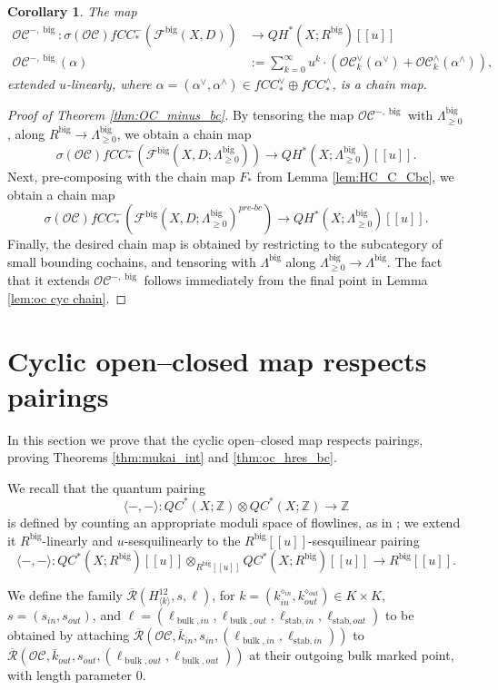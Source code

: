 \documentclass{article}
\newtheorem{cor}[lem]{Corollary}
\def\fuk{\EuF}
\def\cO{\mathcal{O}}
\def\cC{\mathcal{C}}
\def\Z{\mathbb{Z}}
\def\fuk{\mathcal{F}}
\def\prebc{{pre\text{-}bc}}
\def\Rbar{\overline{\mathcal{R}}}
\def\stab{\mathrm{stab}}
\def\big{{\operatorname{big}}}
\def\bulk{{\operatorname{bulk}}}
\begin{document}
\begin{cor}
    The map 
    \begin{align*}
        \cO\cC^{-,\big}: \sigma(\cO\cC)fCC_*^-(\fuk^\big(X,D)) & \to QH^*(X;R^\big)[[u]] \\
        \cO\cC^{-,\big}(\alpha) & := \sum_{k=0}^\infty u^k\cdot \left(\cO\cC^\vee_k(\alpha^\vee) + \cO\cC^\wedge_k(\alpha^\wedge)\right),
    \end{align*}
    extended $u$-linearly, where $\alpha = (\alpha^\vee,\alpha^\wedge) \in fCC^{\vee}_* \oplus fCC^{\wedge}_*$, is a chain map.
\end{cor}

\begin{proof}[Proof of Theorem \ref{thm:OC_minus_bc}]
    By tensoring the map $\cO\cC^{-,\big}$ with $\Lambda^\big_{\ge 0}$, along $R^\big \to \Lambda^\big_{\ge 0}$, we obtain a chain map
    $$\sigma(\cO\cC)fCC_*^-(\fuk^\big(X,D;\Lambda^\big_{\ge 0})) \to QH^*(X;\Lambda^\big_{\ge 0})[[u]].$$
    Next, pre-composing with the chain map $F_*$ from Lemma \ref{lem:HC_C_Cbc}, we obtain a chain map
    $$\sigma(\cO\cC)fCC_*^-(\fuk^\big(X,D;\Lambda^\big_{\ge 0})^{\prebc}) \to QH^*(X;\Lambda^\big_{\ge 0})[[u]].$$ 
    Finally, the desired chain map is obtained by restricting to the subcategory of small bounding cochains, and tensoring with $\Lambda^\big$ along $\Lambda^\big_{\ge 0} \to \Lambda^\big$. 
    The fact that it extends $\cO\cC^{-,\big}$ follows immediately from the final point in Lemma \ref{lem:oc cyc chain}.
\end{proof}

\section{Cyclic open--closed map respects pairings}\label{sec:oc pair}

In this section we prove that the cyclic open--closed map respects pairings, proving Theorems \ref{thm:mukai_int} and \ref{thm:oc_hres_bc}.

We recall that the quantum pairing
$$\langle-,-\rangle: QC^*(X;\Z) \otimes QC^*(X;\Z) \to \Z$$
is defined by counting an appropriate moduli space of flowlines, as in \cite[Section 4.1]{relfukii}; we extend it $R^\big$-linearly and $u$-sesquilinearly to the $R^\big[[u]]$-sesquilinear pairing
$$\langle -, - \rangle : QC^*(X;R^\big)[[u]] \otimes_{R^\big[[u]]} QC^*(X;R^\big)[[u]] \to R^\big[[u]]. $$

We define the family $\Rbar(H^{12}_{\langle k \rangle},s,\ell)$, for $k=(k^{\diamond_{in}}_{in},k^{\diamond_{out}}_{out}) \in K \times K$, $s=(s_{in},s_{out})$, and $\ell = (\ell_{\bulk,in},\ell_{\bulk,out},\ell_{\stab,in},\ell_{\stab,out})$ to be obtained by attaching $\Rbar(\cO\cC,\bar{k}_{in},s_{in},(\ell_{\bulk,in},\ell_{\stab,in}))$ to $\Rbar(\cO\cC,\bar{k}_{out},s_{out},(\ell_{\bulk,out},\ell_{\bulk,out}))$ at their outgoing bulk marked point, with length parameter $0$. 
\end{document}
